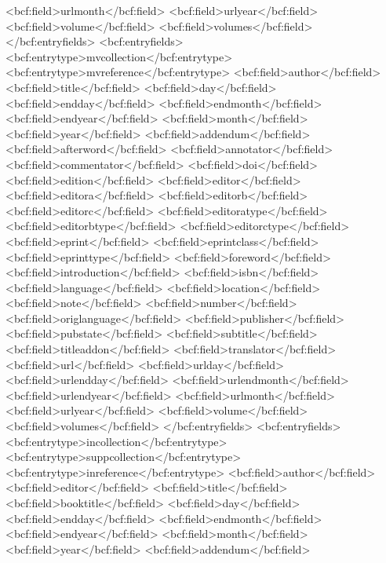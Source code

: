       <bcf:field>urlmonth</bcf:field>
      <bcf:field>urlyear</bcf:field>
      <bcf:field>volume</bcf:field>
      <bcf:field>volumes</bcf:field>
    </bcf:entryfields>
    <bcf:entryfields>
      <bcf:entrytype>mvcollection</bcf:entrytype>
      <bcf:entrytype>mvreference</bcf:entrytype>
      <bcf:field>author</bcf:field>
      <bcf:field>title</bcf:field>
      <bcf:field>day</bcf:field>
      <bcf:field>endday</bcf:field>
      <bcf:field>endmonth</bcf:field>
      <bcf:field>endyear</bcf:field>
      <bcf:field>month</bcf:field>
      <bcf:field>year</bcf:field>
      <bcf:field>addendum</bcf:field>
      <bcf:field>afterword</bcf:field>
      <bcf:field>annotator</bcf:field>
      <bcf:field>commentator</bcf:field>
      <bcf:field>doi</bcf:field>
      <bcf:field>edition</bcf:field>
      <bcf:field>editor</bcf:field>
      <bcf:field>editora</bcf:field>
      <bcf:field>editorb</bcf:field>
      <bcf:field>editorc</bcf:field>
      <bcf:field>editoratype</bcf:field>
      <bcf:field>editorbtype</bcf:field>
      <bcf:field>editorctype</bcf:field>
      <bcf:field>eprint</bcf:field>
      <bcf:field>eprintclass</bcf:field>
      <bcf:field>eprinttype</bcf:field>
      <bcf:field>foreword</bcf:field>
      <bcf:field>introduction</bcf:field>
      <bcf:field>isbn</bcf:field>
      <bcf:field>language</bcf:field>
      <bcf:field>location</bcf:field>
      <bcf:field>note</bcf:field>
      <bcf:field>number</bcf:field>
      <bcf:field>origlanguage</bcf:field>
      <bcf:field>publisher</bcf:field>
      <bcf:field>pubstate</bcf:field>
      <bcf:field>subtitle</bcf:field>
      <bcf:field>titleaddon</bcf:field>
      <bcf:field>translator</bcf:field>
      <bcf:field>url</bcf:field>
      <bcf:field>urlday</bcf:field>
      <bcf:field>urlendday</bcf:field>
      <bcf:field>urlendmonth</bcf:field>
      <bcf:field>urlendyear</bcf:field>
      <bcf:field>urlmonth</bcf:field>
      <bcf:field>urlyear</bcf:field>
      <bcf:field>volume</bcf:field>
      <bcf:field>volumes</bcf:field>
    </bcf:entryfields>
    <bcf:entryfields>
      <bcf:entrytype>incollection</bcf:entrytype>
      <bcf:entrytype>suppcollection</bcf:entrytype>
      <bcf:entrytype>inreference</bcf:entrytype>
      <bcf:field>author</bcf:field>
      <bcf:field>editor</bcf:field>
      <bcf:field>title</bcf:field>
      <bcf:field>booktitle</bcf:field>
      <bcf:field>day</bcf:field>
      <bcf:field>endday</bcf:field>
      <bcf:field>endmonth</bcf:field>
      <bcf:field>endyear</bcf:field>
      <bcf:field>month</bcf:field>
      <bcf:field>year</bcf:field>
      <bcf:field>addendum</bcf:field>
